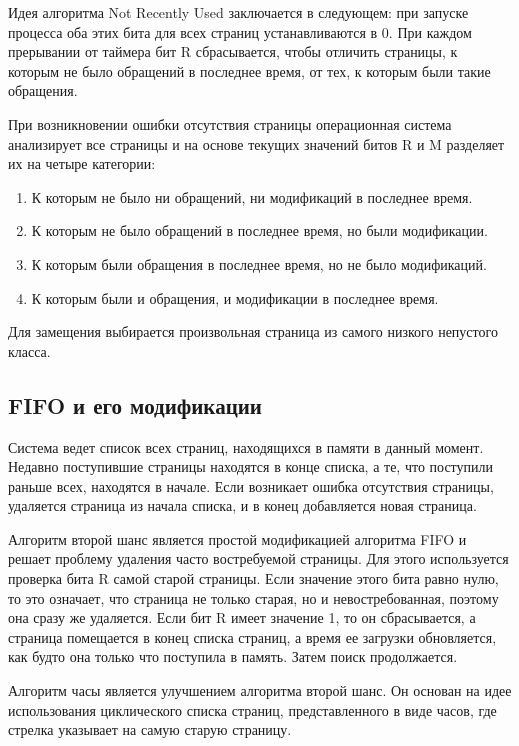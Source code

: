 Идея алгоритма Not Recently Used заключается в следующем: при запуске процесса оба этих бита для всех страниц
устанавливаются в 0. 
При каждом прерывании от таймера бит R сбрасывается, чтобы отличить страницы, к которым не было обращений в последнее время, от тех, к которым были такие обращения.

При возникновении ошибки отсутствия страницы операционная система анализирует все страницы и на основе текущих значений битов R и M разделяет их на четыре категории:
\begin{enumerate}
	\item К которым не было ни обращений, ни модификаций в последнее время.
	\item К которым не было обращений в последнее время, но были модификации.
	\item К которым были обращения в последнее время, но не было модификаций.
	\item К которым были и обращения, и модификации в последнее время.
\end{enumerate}

Для замещения выбирается произвольная страница из самого низкого непустого класса.

\subsection{FIFO и его модификации}

Система ведет список всех страниц, находящихся в памяти в данный момент.
Недавно поступившие страницы находятся в конце
списка, а те, что поступили раньше всех, находятся в начале. 
Если возникает ошибка отсутствия страницы, удаляется страница из начала списка, и в конец добавляется новая страница.

Алгоритм второй шанс является простой модификацией алгоритма FIFO и решает проблему удаления часто востребуемой страницы.
Для этого используется проверка бита R самой старой страницы. 
Если значение этого бита равно нулю, то это означает, что страница не только старая, но и невостребованная, поэтому она сразу же удаляется.
Если бит R имеет значение 1, то он сбрасывается, а страница помещается в конец списка страниц, а время ее загрузки обновляется, как будто она только что поступила в память.
Затем поиск продолжается.

Алгоритм часы является улучшением алгоритма второй шанс.
Он основан на идее использования циклического списка страниц, представленного в виде часов, где стрелка указывает на самую старую страницу.

